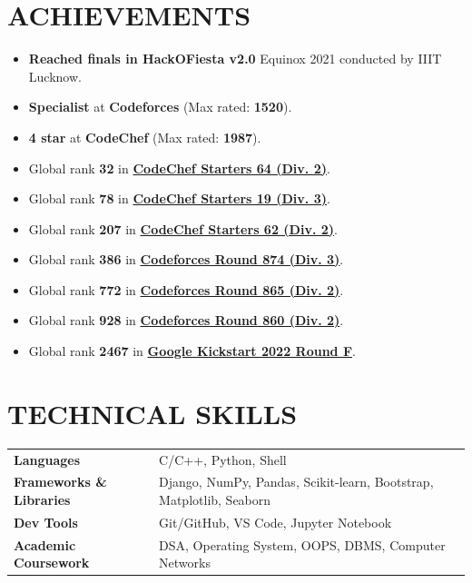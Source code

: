 \documentclass[12pt]{article}
\begin{document}
\section*{ACHIEVEMENTS}
\begin{itemize}[leftmargin=15px, topsep=1pt, itemsep=1pt, partopsep=2pt, parsep=2pt]
  \item \textbf{Reached finals in HackOFiesta v2.0} Equinox 2021 conducted by IIIT Lucknow.
  \item \textbf{Specialist} at \textbf{Codeforces} (Max rated: \textbf{1520}).
  \item \textbf{4 star} at \textbf{CodeChef} (Max rated: \textbf{1987}).
  \item Global rank \textbf{32} in \href{https://www.codechef.com/rankings/START64B?search=tanishka125}{\textbf{CodeChef Starters 64 (Div. 2)}}.
  \item Global rank \textbf{78} in \href{https://www.codechef.com/rankings/START19C?search=tanishka125}{\textbf{CodeChef Starters 19 (Div. 3)}}.
  \item Global rank \textbf{207} in \href{https://www.codechef.com/rankings/START62B?search=tanishka125}{\textbf{CodeChef Starters 62 (Div. 2)}}.
  \item Global rank \textbf{386} in \href{https://codeforces.com/contest/1833/standings/participant/155663820#p155663820}{\textbf{Codeforces Round 874 (Div. 3)}}.
  \item Global rank \textbf{772} in \href{https://codeforces.com/contest/1816/standings/participant/153504271#p153504271}{\textbf{Codeforces Round 865 (Div. 2)}}.
  \item Global rank \textbf{928} in \href{https://codeforces.com/contest/1798/standings/participant/152498821#p152498821}{\textbf{Codeforces Round 860 (Div. 2)}}.
  \item Global rank \textbf{2467} in \href{https://codingcompetitions.withgoogle.com/kickstart/submissions/00000000008cb409/0000000000648019}{\textbf{Google Kickstart 2022 Round F}}.
\end{itemize}

\section*{TECHNICAL SKILLS}
\vspace{-2pt}
\begin{tabularx}{\textwidth}{@{}ll}
  \textbf{Languages} & C/C++, Python, Shell \\
  \textbf{Frameworks \& Libraries} & Django, NumPy, Pandas, Scikit-learn, Bootstrap, Matplotlib, Seaborn \\
  \textbf{Dev Tools} & Git/GitHub, VS Code, Jupyter Notebook \\
  \textbf{Academic Coursework} & DSA, Operating System, OOPS, DBMS, Computer Networks \\
\end{tabularx}
\end{document}
